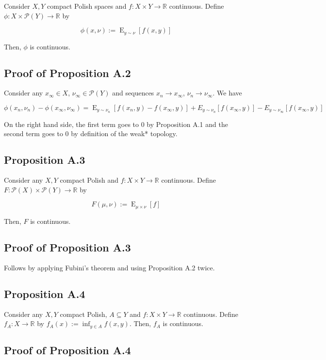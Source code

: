 \documentclass[a4paper]{article}
\DeclareMathOperator{\E}{E}
\newcommand{\Reals}{\mathbb{R}}
\newcommand{\Prob}{\mathcal{P}}
\begin{document}
Consider ${X,Y}$ compact Polish spaces and ${f: X \times Y \rightarrow \Reals}$ continuous. Define ${\phi: X \times \Prob(Y) \rightarrow \Reals}$ by 

$${\phi(x,\nu):=\E_{y \sim \nu}[f(x,y)]}$$ 

Then, ${\phi}$ is continuous.

\subsection{Proof of Proposition A.2}

Consider any ${x_\infty \in X}$, ${\nu_\infty \in \Prob(Y)}$ and sequences ${x_n \rightarrow x_\infty}$, ${\nu_n \rightarrow \nu_\infty}$. We have

$$\phi(x_n,\nu_n)- \phi(x_\infty,\nu_\infty)=\E_{y \sim \nu_n}[f(x_n,y)-f(x_\infty,y)]+E_{y \sim \nu_n}[f(x_\infty,y)]-E_{y \sim \nu_\infty}[f(x_\infty,y)]$$

On the right hand side, the first term goes to 0 by Proposition A.1 and the second term goes to 0 by definition of the weak* topology.

\subsection{Proposition A.3}

Consider any ${X,Y}$ compact Polish and ${f: X \times Y \rightarrow \Reals}$ continuous. Define ${F: \Prob(X) \times \Prob(Y) \rightarrow \Reals}$ by 

$${F(\mu,\nu):=\E_{\mu \times \nu}[f]}$$ 

Then, ${F}$ is continuous.

\subsection{Proof of Proposition A.3}

Follows by applying Fubini's theorem and using Proposition A.2 twice.

\subsection{Proposition A.4}

Consider any ${X,Y}$ compact Polish, ${A \subseteq Y}$ and ${f: X \times Y \rightarrow \Reals}$ continuous. Define ${f_A: X \rightarrow \Reals}$ by ${f_A(x):= \inf_{y \in A} f(x,y)}$. Then, ${f_A}$ is continuous.

\subsection{Proof of Proposition A.4}
\end{document}
